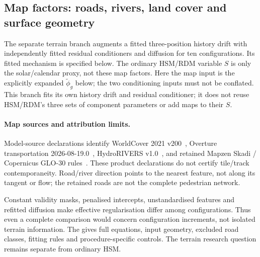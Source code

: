 \subsection{Map factors: roads, rivers, land cover and surface geometry}\label{sec:terrain-methods}
The separate terrain branch augments a fitted three-position history drift
with independently fitted residual conditioners and diffusion for ten
configurations. Its fitted mechanism is specified below.
The ordinary HSM/RDM variable $S$ is only the solar/calendar proxy, not
these map factors. Here the map input is the explicitly expanded
$\widetilde\phi_g$ below; the two conditioning inputs must not be conflated.
This branch fits its own history drift and residual conditioner; it does
not reuse HSM/RDM's three sets of component parameters or add maps to their $S$.

\paragraph{Map sources and attribution limits.}
Model-source declarations identify
WorldCover 2021 v200~\cite{worldcover2021}, Overture transportation
2026-08-19.0~\cite{overture202608,overtureattribution}, HydroRIVERS
v1.0~\cite{hydrorivers2013,hydroriverslicense}, and retained Mapzen Skadi /
Copernicus GLO-30 rules~\cite{mapzenterrain,mapzenattribution,copernicusdem2021}.
These product declarations do not certify tile/track contemporaneity.
Road/river direction points to the nearest feature, not along its tangent
or flow; the retained roads are not the complete pedestrian network.

Constant validity masks, penalised intercepts, unstandardised features and
refitted diffusion make effective regularisation differ among configurations.
Thus even a complete comparison would concern configuration increments,
not isolated terrain information. The  gives full equations,
input geometry, excluded road classes, fitting rules and procedure-specific
controls. The terrain research question remains separate from ordinary HSM.

